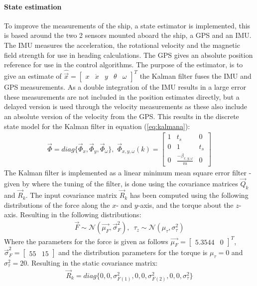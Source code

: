 \documentclass[a0,portrait]{a0poster}
\begin{document}
\begin{center}
{\paragraph{State estimation}
To improve the measurements of the ship, a state estimator is implemented, this is based around the two 2 sensors mounted aboard the ship, a GPS and an IMU. The IMU measures the acceleration, the rotational velocity and the magnetic field strength for use in heading calculations. The GPS gives an absolute position reference for use in the control algorithms. The purpose of the estimator, is to give an estimate of $\hat{\vec{x}} = \begin{bmatrix}x & \dot{x} & y & \theta & \omega\end{bmatrix}^T$ the Kalman filter fuses the IMU and GPS measurements. As a double integration of the IMU results in a large error these measurements are not included in the position estimates directly, but a delayed version is used through the velocity measurements as these also include an absolute version of the velocity from the GPS. This results in the discrete state model for the Kalman filter in equation (\ref{eq:kalmana}):
\begin{align}
\vec{\Phi} = diag\{\vec{\Phi} _x,\vec{\Phi} _y,\vec{\Phi} _\omega\},\,\, \vec{\Phi}_{x,y,\omega}(k) = \begin{bmatrix}
1 & t_s & 0\\
0 & 1 & t_s\\
0 & \frac{-\beta_{x,y,\omega}}{m} & 0
\end{bmatrix}
\label{eq:kalmana}
\end{align}
The Kalman filter is implemented as a linear minimum mean square error filter - given by \cite{grewal} where the tuning of the filter, is done using the covariance matrices $\vec{Q}_k$ and $\vec{R}_k$. The input covariance matrix $\vec{R}_k$ has been computed using the following distributions of the force along the $x$- and $y$-axis, and the torque about the $z$-axis. Resulting in the following distributions:
\begin{align}
\vec{F} \sim \mathcal{N}(\vec{\mu_F},\vec{\sigma}^2_F),\,\,\, \tau_z \sim \mathcal{N}(\mu_{\tau},\sigma^2_{\tau})
\end{align}
Where the parameters for the force is given as follows $\vec{\mu_F} = \begin{bmatrix}5.3544 & 0\end{bmatrix}^T$, $\vec{\sigma}^2_F = \begin{bmatrix}55 & 15\end{bmatrix}$ and the distribution parameters for the torque is $\mu_{\tau} = 0$ and $\sigma^2_{\tau} = 20$. Resulting in the static covariance matrix:
\begin{align}
\vec{R}_k = diag\{0,0,\sigma^2_{F(1)},0,0,\sigma^2_{F(2)},0,0,\sigma^2_\tau\}
\end{align}
}
\col{
}
\end{center}
\end{document}
